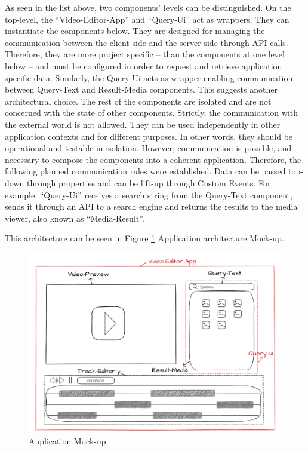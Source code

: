 As seen in the list above, two components’ levels can be distinguished. On the top-level, the “Video-Editor-App” and “Query-Ui” act as wrappers. They can instantiate the components below. They are designed for managing the communication between the client side and the server side through API calls. Therefore, they are more project specific – than the components at one level below – and must be configured in order to request and retrieve application specific data. Similarly, the Query-Ui acts as wrapper enabling communication between Query-Text and Result-Media components.
This suggests another architectural choice. The rest of the components are isolated and are not concerned with the state of other components. Strictly, the communication with the external world is not allowed. They can be used independently in other application contexts and for different purposes. In other words, they should be operational and testable in isolation.
However, communication is possible, and necessary to compose the components into a coherent application. Therefore, the following planned communication rules were established. Data can be passed top-down through properties and can be lift-up through Custom Events. For example, “Query-Ui” receives a search string from the Query-Text component, sends it through an API to a search engine and returns the results to the media viewer, also known as “Media-Result”.

This architecture can be seen in Figure \ref{fig:appMockUp} Application architecture Mock-up.

\begin{figure}[H]
\centering
\includegraphics[width=1\textwidth]{images/Wireframe.png}
\caption{Application Mock-up}
\label{fig:appMockUp}
\end{figure}

